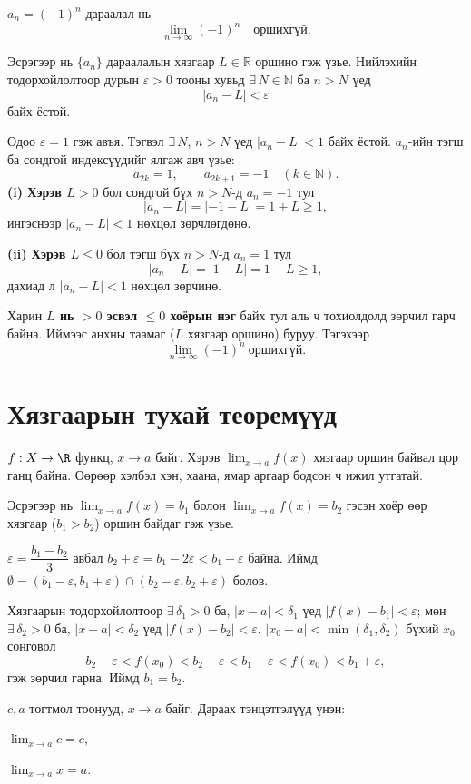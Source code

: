 \begin{example}
$a_n = (-1)^n$ дараалал нь 
\[
\lim_{n\to\infty} (-1)^n \quad \text{оршихгүй}.
\]
\end{example}
\begin{prof}
Эсрэгээр нь $\{a_n\}$ дараалалын хязгаар $L\in\mathbb{R}$ оршино гэж үзье. 
Нийлэхийн тодорхойлолтоор дурын $\varepsilon>0$ тооны хувьд $\exists\,N\in\mathbb{N}$ ба $n>N$ үед 
\[
|a_n-L|<\varepsilon
\]
байх ёстой.

Одоо $\varepsilon=1$ гэж авъя. Тэгвэл $\exists\,N$, $n>N$ үед $|a_n-L|<1$ байх ёстой.
 $a_n$-ийн тэгш ба сондгой индексүүдийг ялгаж авч үзье:
\[
a_{2k}=1,\qquad a_{2k+1}=-1\quad (k\in\mathbb{N}).
\]
\textbf{(i) Хэрэв $L> 0$} бол сондгой бүх $n> N$-д $a_n=-1$ тул
\[
|a_n-L|=|-1-L|=1+L\ge 1,
\]
ингэснээр $|a_n-L|<1$ нөхцөл зөрчлөгдөнө.

\textbf{(ii) Хэрэв $L\le 0$} бол тэгш бүх $n> N$-д $a_n=1$ тул
\[
|a_n-L|=|1-L|=1-L\ge 1,
\]
дахиад л $|a_n-L|<1$ нөхцөл зөрчинө.

Харин \textbf{$L$ нь $>0$ эсвэл $\le 0$ хоёрын нэг} байх тул аль ч тохиолдолд зөрчил гарч байна. 
Иймээс анхны таамаг (\(L\) хязгаар оршино) буруу. Тэгэхээр
\[
\lim_{n\to\infty}(-1)^n \ \text{оршихгүй}.
\]
\end{prof}
\chapter{Хязгаарын тухай теоремүүд }

\begin{theorem}\label{uniqlim}
$f:X\to\R$ функц, $x\to a$ байг. Хэрэв $\displaystyle\lim_{x\to a} f(x)$ хязгаар оршин байвал цор ганц байна. Өөрөөр хэлбэл хэн, хаана, ямар аргаар бодсон ч ижил утгатай.
\end{theorem}

\begin{prof}
Эсрэгээр нь $\lim_{x\to a}f(x)=b_1$ болон $\lim_{x\to a}f(x)=b_2$ гэсэн хоёр өөр хязгаар ($b_1>b_2$) оршин байдаг гэж үзье.

$\varepsilon=\dfrac{b_1-b_2}{3}$ авбал $b_2+\varepsilon=b_1-2\varepsilon<b_1-\varepsilon$ байна. Иймд $\emptyset=(b_1-\varepsilon, b_1+\varepsilon)\cap (b_2-\varepsilon,b_2+\varepsilon)$ болов.

Хязгаарын тодорхойлолтоор $\exists\,\delta_1>0$ ба, $|x-a|<\delta_1$ үед $|f(x)-b_1|<\varepsilon$; мөн $\exists\,\delta_2>0$ ба, $|x-a|<\delta_2$ үед $|f(x)-b_2|<\varepsilon$. $|x_0-a|<\min(\delta_1,\delta_2)$ бүхий $x_0$ сонговол
\[
b_2-\varepsilon<f(x_0)<b_2+\varepsilon<b_1-\varepsilon<f(x_0)<b_1+\varepsilon,
\]
гэж зөрчил гарна. Иймд $b_1=b_2$.
\end{prof}
\begin{theorem}\label{conslim}
$c,a$ тогтмол тоонууд, $x\to a$ байг. Дараах тэнцэтгэлүүд үнэн:
\begin{description}[leftmargin=2em]
  \item[(P1)] $\displaystyle\lim_{x\to a} c = c$,
  \item[(P2)] $\displaystyle\lim_{x\to a} x = a$.
\end{description}
\end{theorem}

